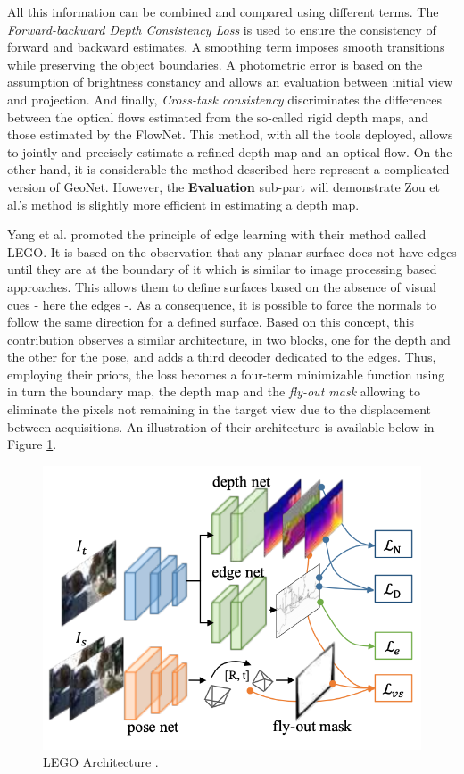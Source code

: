  
All this information can be combined and compared using different terms. The \emph{Forward-backward Depth Consistency Loss} is used to ensure the consistency of forward and backward estimates. A smoothing term imposes smooth transitions while preserving the object boundaries. A photometric error is based on the assumption of brightness constancy and allows an evaluation between initial view and projection. And finally, \emph{Cross-task consistency} discriminates the differences between the optical flows estimated from the so-called rigid depth maps, and those estimated by the FlowNet. 
This method, with all the tools deployed, allows to jointly and precisely estimate a refined depth map and an optical flow. On the other hand, it is considerable the method described here represent a complicated version of GeoNet. However, the \textbf{Evaluation} sub-part will demonstrate Zou et al.'s method is slightly more efficient in estimating a depth map.


Yang et al. \cite{yang2018lego} promoted the principle of edge learning with their method called LEGO. It is based on the observation that any planar surface does not have edges until they are at the boundary of it which is similar to image processing based approaches. This allows them to define surfaces based on the absence of visual cues - here the edges -. As a consequence, it is possible to force the normals to follow the same direction for a defined surface. Based on this concept, this contribution observes a similar architecture, in two blocks, one for the depth and the other for the pose, and adds a third decoder dedicated to the edges.
Thus, employing their priors, the loss becomes a four-term minimizable function using in turn the boundary map, the depth map and the \emph{fly-out mask} allowing to eliminate the pixels not remaining in the target view due to the displacement between acquisitions. An illustration of their architecture is available below in Figure \ref{yang2018illu}.

\begin{figure}[h]
	\centering
	\includegraphics[width=0.4\linewidth]{Figures/SOA/yang2018illu}
	\caption[LEGO Architecture.]{LEGO Architecture \cite{yang2018lego}.}
	\label{yang2018illu}
\end{figure}



